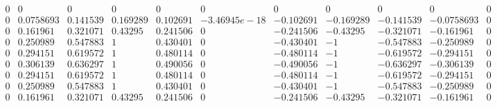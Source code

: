 \documentclass{article}
\begin{document}
\[
\begin{array}{ccccccccccc}

\scriptstyle 0  &  \scriptstyle 0  &  \scriptstyle 0  &  \scriptstyle 0  &  \scriptstyle 0  &  \scriptstyle 0  &  \scriptstyle 0  &  \scriptstyle 0  &  \scriptstyle 0  &  \scriptstyle 0  &  \scriptstyle 0    \\
\scriptstyle 0  &  \scriptstyle 0.0758693  &  \scriptstyle 0.141539  &  \scriptstyle 0.169289  &  \scriptstyle 0.102691  &  \scriptstyle -3.46945e-18  &  \scriptstyle -0.102691  &  \scriptstyle -0.169289  &  \scriptstyle -0.141539  &  \scriptstyle -0.0758693  &  \scriptstyle 0    \\
\scriptstyle 0  &  \scriptstyle 0.161961  &  \scriptstyle 0.321071  &  \scriptstyle 0.43295  &  \scriptstyle 0.241506  &  \scriptstyle 0  &  \scriptstyle -0.241506  &  \scriptstyle -0.43295  &  \scriptstyle -0.321071  &  \scriptstyle -0.161961  &  \scriptstyle 0    \\
\scriptstyle 0  &  \scriptstyle 0.250989  &  \scriptstyle 0.547883  &  \scriptstyle 1  &  \scriptstyle 0.430401  &  \scriptstyle 0  &  \scriptstyle -0.430401  &  \scriptstyle -1  &  \scriptstyle -0.547883  &  \scriptstyle -0.250989  &  \scriptstyle 0    \\
\scriptstyle 0  &  \scriptstyle 0.294151  &  \scriptstyle 0.619572  &  \scriptstyle 1  &  \scriptstyle 0.480114  &  \scriptstyle 0  &  \scriptstyle -0.480114  &  \scriptstyle -1  &  \scriptstyle -0.619572  &  \scriptstyle -0.294151  &  \scriptstyle 0    \\
\scriptstyle 0  &  \scriptstyle 0.306139  &  \scriptstyle 0.636297  &  \scriptstyle 1  &  \scriptstyle 0.490056  &  \scriptstyle 0  &  \scriptstyle -0.490056  &  \scriptstyle -1  &  \scriptstyle -0.636297  &  \scriptstyle -0.306139  &  \scriptstyle 0    \\
\scriptstyle 0  &  \scriptstyle 0.294151  &  \scriptstyle 0.619572  &  \scriptstyle 1  &  \scriptstyle 0.480114  &  \scriptstyle 0  &  \scriptstyle -0.480114  &  \scriptstyle -1  &  \scriptstyle -0.619572  &  \scriptstyle -0.294151  &  \scriptstyle 0    \\
\scriptstyle 0  &  \scriptstyle 0.250989  &  \scriptstyle 0.547883  &  \scriptstyle 1  &  \scriptstyle 0.430401  &  \scriptstyle 0  &  \scriptstyle -0.430401  &  \scriptstyle -1  &  \scriptstyle -0.547883  &  \scriptstyle -0.250989  &  \scriptstyle 0   \\
\scriptstyle 0  &  \scriptstyle 0.161961  &  \scriptstyle 0.321071  &  \scriptstyle 0.43295  &  \scriptstyle 0.241506  &  \scriptstyle 0  &  \scriptstyle -0.241506  &  \scriptstyle -0.43295  &  \scriptstyle -0.321071  &  \scriptstyle -0.161961  &  \scriptstyle 0   \\

\end{array}\]
\end{document}
